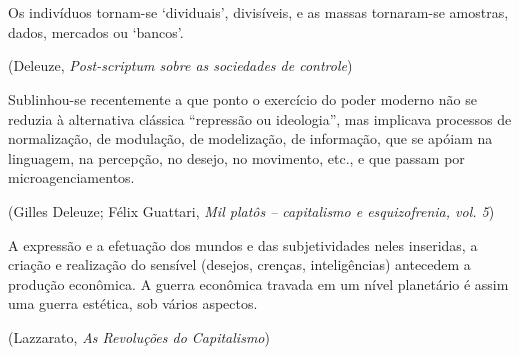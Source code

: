 \chapter*{}

\vspace*{\fill}

\thispagestyle{empty}

\epigraph{Os indivíduos tornam-se `dividuais', divisíveis, e as massas
tornaram-se amostras, dados, mercados ou `bancos'.}{(Deleuze, \emph{Post-scriptum sobre as sociedades de controle})}

\epigraph{Sublinhou-se recentemente a que ponto o exercício do poder moderno não
se reduzia à alternativa clássica ``repressão ou ideologia'', mas
implicava processos de normalização, de modulação, de modelização, de
informação, que se apóiam na linguagem, na percepção, no desejo, no
movimento, etc., e que passam por microagenciamentos.}{(Gilles Deleuze; Félix Guattari, \emph{Mil platôs -- capitalismo e esquizofrenia, vol. 5})}

\epigraph{A expressão e a efetuação dos mundos e das subjetividades neles
inseridas, a criação e realização do sensível (desejos, crenças,
inteligências) antecedem a produção econômica. A guerra econômica
travada em um nível planetário é assim uma guerra estética, sob vários
aspectos.}{(Lazzarato, \emph{As Revoluções do Capitalismo})}
